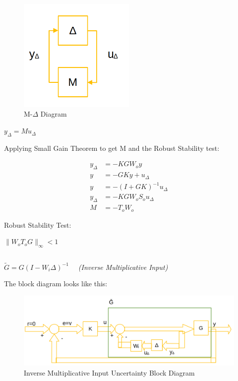 \documentclass{article}
\begin{document}
\begin{figure}[H]
    \centering
    \includegraphics[width=0.5\textwidth]{mDeltaDiagram.png}
    \caption{M-$\Delta$ Diagram}
    \label{fig:mDeltaDiagram1}
\end{figure}

$y_\Delta = Mu_\Delta$

Applying Small Gain Theorem to get M and the Robust Stability test:

\begin{align}
    y_\Delta &= -K G W_o y \\
    y &= -GKy+u_\Delta \\
    y &= -(I + GK)^{-1} u_\Delta \\
    y_\Delta &= -K G W_o S_o u_\Delta \\
    M &= -T_o W_o
\end{align}

Robust Stability Test:

$\| W_o T_o G\|_\infty < 1$

\subsection{}
\textit{$\tilde{G}=G\left(I-W_i \Delta\right)^{-1} \quad$ (Inverse Multiplicative Input)}

The block diagram looks like this:

\begin{figure}[H]
    \centering
    \includegraphics[width=\textwidth]{1bDiagram.png}
    \caption{Inverse Multiplicative Input Uncertainty Block Diagram}
    \label{fig:1bDiagram}
\end{figure}
\end{document}
